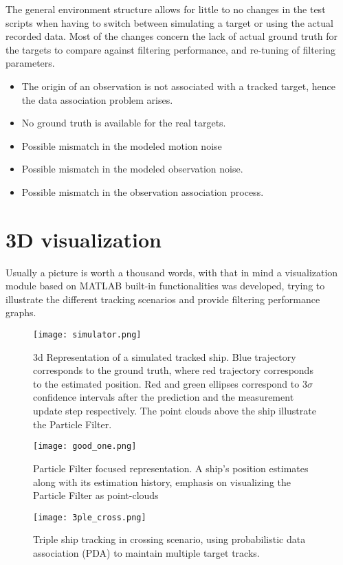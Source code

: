 The general environment structure allows for little to no changes in the test scripts when having to switch between simulating a target or using the actual recorded data. Most of the changes concern the lack of actual ground truth for the targets to compare against filtering performance, and re-tuning of filtering parameters.
\begin{itemize}
	\item  The origin of an observation is not associated with a tracked target, hence the data association problem arises.
	\item No ground truth is available for the real targets.
	\item Possible mismatch in the modeled motion noise 
	\item Possible mismatch in the modeled observation noise.
	\item Possible mismatch in the observation association process.
\end{itemize}

\section{3D visualization}

Usually a picture is worth a thousand words, with that in mind a visualization module based on MATLAB built-in functionalities was developed, trying to illustrate the different tracking scenarios and provide filtering performance graphs. 

\begin{figure}[H]
	\centering
	\texttt{[image: simulator.png]}
	\caption{3d Representation of a simulated tracked ship. Blue trajectory corresponds to the ground truth, where red trajectory corresponds to the estimated position. Red and green ellipses correspond to $3\sigma$ confidence intervals after the prediction and the measurement update step respectively. The point clouds above the ship illustrate the Particle Filter.}
	\label{fig:simulator1}
\end{figure}

\begin{figure}[H]
	\centering
	\texttt{[image: good\_one.png]}
		\caption{Particle Filter focused representation. A ship's position estimates along with its estimation history, emphasis on visualizing the Particle Filter as  point-clouds}	\label{fig:simulator2}
\end{figure}


\begin{figure}[H]
	\centering
	\texttt{[image: 3ple\_cross.png]}
	\caption{Triple ship tracking in crossing scenario, using probabilistic data association (PDA) to maintain multiple target tracks.	}\label{fig:simulator3}
\end{figure}



